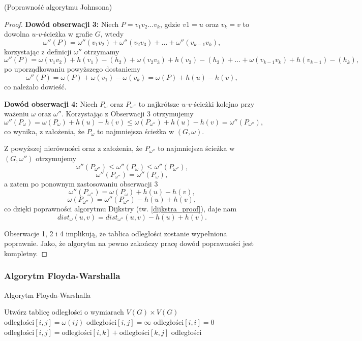 \begin{theorem}{(Poprawność algorytmu Johnsona)}
\begin{proof}
		\textbf{Dowód obserwacji 3:} Niech $P=v_1v_2\dots v_k$, 
		gdzie $v1 = u$ oraz $v_k = v$ to dowolna $u$-$v$-ścieżka
		w grafie $G$, wtedy 
		\[\omega''(P) = \omega''(v_1v_2) + \omega''(v_2v_3) + \dots + \omega''(v_{k-1}v_k),\]
		korzystając z definicji $\omega''$ otrzymamy
		\[\omega''(P) = \omega(v_1v_2) + h(v_1) - (h_2) + 
		\omega(v_2v_3) + h(v_2) - (h_3) + 
		\dots + \omega(v_{k-1}v_k) + h(v_{k-1}) - (h_k),\]
		po uporządkowaniu powyższego dostaniemy
		\[\omega''(P) = \omega(P) + \omega(v_1) - \omega(v_k) = \omega(P) + h(u) - h(v),\]
		co należało dowieść.
		
		\textbf{Dowód obserwacji 4:} Niech $P_{\omega}$ oraz 
		$P_{\omega''}$ to najkrótsze $u$-$v$-ścieżki kolejno 
		przy ważeniu $\omega$ oraz $\omega''$. Korzystając z 
		Obserwacji 3 otrzymujemy
		\[\omega''(P_{\omega}) = \omega(P_{\omega}) + h(u) - h(v) \leq
		\omega(P_{\omega''}) + h(u) - h(v) = \omega''(P_{\omega''}),\]
		co wynika, z założenia, że $P_{\omega}$ to 
		najmniejsza ścieżka w $(G, \omega)$. 
		
		Z powyższej nierówności oraz z założenia, że $P_{\omega''}$ to 
		najmniejsza ścieżka w $(G, \omega'')$ otrzymujemy
		\[\omega''(P_{\omega''}) \leq \omega''(P_{\omega}) \leq \omega''(P_{\omega''}), \]
		\[\omega''(P_{\omega''}) = \omega''(P_{\omega}),\]
		a zatem po ponownym zastosowaniu obserwacji 3
		\[\omega''(P_{\omega''}) = \omega(P_{\omega}) + h(u) - h(v),\]
		\[\omega(P_{\omega''}) = \omega''(P_{\omega''}) - h(u) + h(v),\]
		co dzięki poprawności algorytmu Dijkstry (tw. \ref{dijkstra_proof}),
		daje nam
		\[dist_{\omega}(u, v) = dist_{\omega''}(u, v) - h(u) + h(v).\]
		
		Obserwacje 1, 2 i 4 implikują, że tablica odległości zostanie
		wypełniona poprawnie. Jako, że algorytm na pewno zakończy pracę
		dowód poprawności jest kompletny.
	\end{proof} 
\end{theorem}

\subsubsection{Algorytm Floyda-Warshalla}
\begin{algorithm}[H]
	\caption{Algorytm Floyda-Warshalla}
	\begin{algorithmic}[1]
		\State Utwórz tablicę odległości o wymiarach $V(G) \times V(G)$
		\State $\text{odległości}[i, j] = \omega(ij)$
		\Else
		\State $\text{odległości}[i, j] = \infty$
		\EndIf
		\EndFor
		\EndFor
		\State $\text{odległości}[i, i] = 0$
		\EndFor
		\State $\text{odległości}[i, j] = \text{odległości}[i, k] + \text{odległości}[k, j]$
		\EndIf
		\EndFor
		\EndFor
		\EndFor
		\State \Return odległości
		\EndProcedure
	\end{algorithmic}
	\label{floydWarshall_alg}
\end{algorithm}


